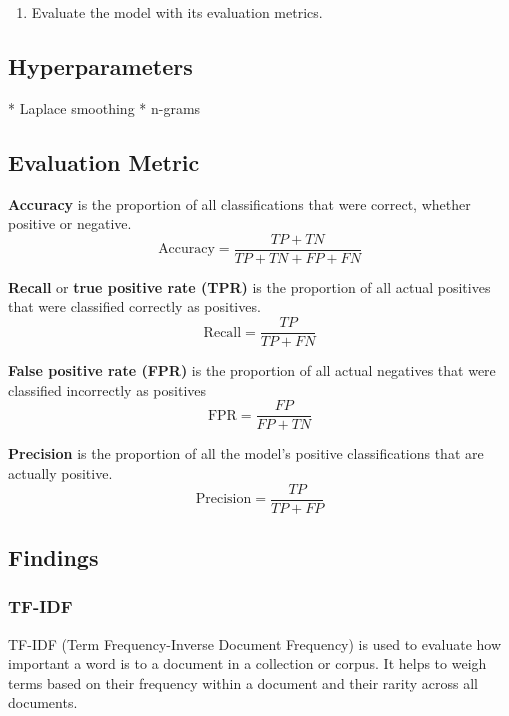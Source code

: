 \begin{enumerate}
    \item Evaluate the model with its evaluation metrics.
\end{enumerate}



\subsection{Hyperparameters}

* Laplace smoothing
* n-grams




\subsection{Evaluation Metric \cite{google_accuracy}}

\textbf{Accuracy} is the proportion of all classifications that were correct, whether positive or negative.
\begin{equation}
    \text{Accuracy} = \frac{TP + TN}{TP + TN + FP + FN}
\end{equation}

\textbf{Recall} or \textbf{true positive rate (TPR)} is the proportion of all actual positives that were classified correctly as positives.
\begin{equation}
    \text{Recall} = \frac{TP}{TP + FN}
\end{equation}

\textbf{False positive rate (FPR)} is the proportion of all actual negatives that were classified incorrectly as positives
\begin{equation}
    \text{FPR} = \frac{FP}{FP + TN}
\end{equation}

\textbf{Precision} is the proportion of all the model's positive classifications that are actually positive.
\begin{equation}
    \text{Precision} = \frac{TP}{TP + FP}
\end{equation}




\subsection{Findings}

\subsubsection{TF-IDF \cite{learndatasci_tfidf}}
TF-IDF (Term Frequency-Inverse Document Frequency)  is used to evaluate how important a word is to a document in a collection or corpus.
It helps to weigh terms based on their frequency within a document and their rarity across all documents.

